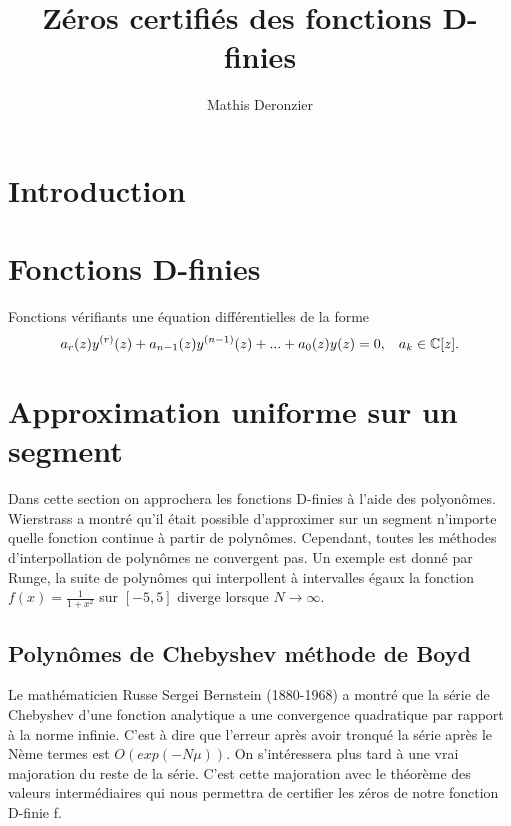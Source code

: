 \documentclass[a4paper,10.5pt]{article}
\title{Zéros certifiés des fonctions D-finies}
\author{Mathis Deronzier}
\date{}
\begin{document}
	
	\maketitle
	\renewcommand{\contentsname}{Sommaire}
	\newpage
	\tableofcontents
	\newpage
	
	\section{Introduction}
	\newtheorem{theorem}{Théorème}[section] 
	\newtheorem{proposition}{Proposition}
	\newtheorem{corollaire}{Corollaire}
	\newtheorem{definition}{Définition}
	\section{Fonctions D-finies}
	
	Fonctions vérifiants une équation différentielles de la forme
	\[a_{r}(z)y^{(r)}(z)+a_{n-1}(z)y^{(n-1)}(z)+...+a_{0}(z)y(z)=0, \hspace{3mm} a_{k}\in \mathbb{C}[z].\] 
	
	
	
	
	
	\section{Approximation uniforme sur un segment}
	
	Dans cette section on approchera les fonctions D-finies à l'aide des polyonômes.
	Wierstrass a montré qu'il était possible d'approximer sur un segment n'importe quelle fonction continue à partir de polynômes. Cependant, toutes les méthodes d'interpollation de polynômes ne convergent pas. Un exemple est donné par Runge, la suite de polynômes qui interpollent à intervalles égaux la fonction $f(x)=\frac{1}{1+x^{2}}$ sur $[-5,5]$ diverge lorsque $N \rightarrow \infty$.
	
	\subsection{Polynômes de Chebyshev méthode de Boyd}
	
	
	Le mathématicien Russe Sergei Bernstein (1880-1968) a montré que la série de Chebyshev d'une fonction analytique a une convergence quadratique par rapport à la norme infinie. C'est à dire que l'erreur après avoir tronqué la série après le Nème termes est $O(exp(-N\mu))$. On s'intéressera plus tard à une vrai majoration du reste de la série.
	C'est cette majoration avec le théorème des valeurs intermédiaires qui nous permettra de certifier les zéros de notre fonction D-finie f.
	
\end{document}
